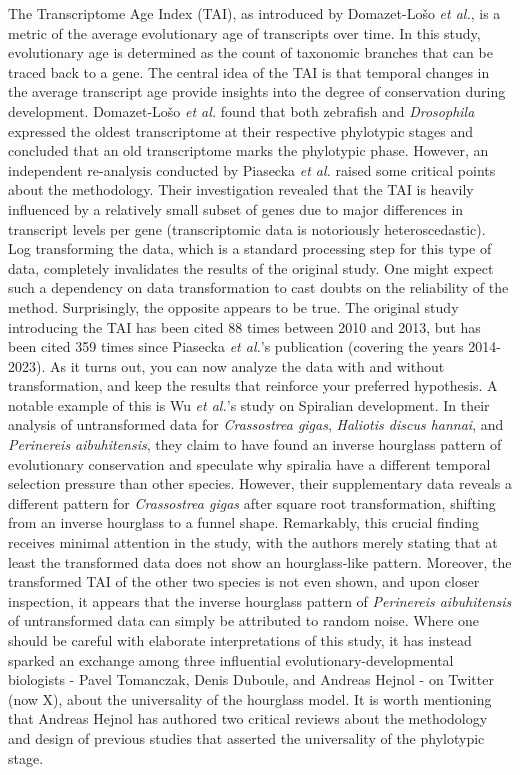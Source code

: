 The Transcriptome Age Index (TAI), as introduced by Domazet-Lošo \textit{et al.}, is a metric of the average evolutionary age of transcripts over time\cite{DomazetLoso2010}. In this study, evolutionary age is determined as the count of taxonomic branches that can be traced back to a gene. The central idea of the TAI is that temporal changes in the average transcript age provide insights into the degree of conservation during development. Domazet-Lošo \textit{et al.} found that both zebrafish and \textit{Drosophila} expressed the oldest transcriptome at their respective phylotypic stages and concluded that an old transcriptome marks the phylotypic phase. However, an independent re-analysis conducted by Piasecka \textit{et al.} raised some critical points about the methodology\cite{Piasecka2013}. Their investigation revealed that the TAI is heavily influenced by a relatively small subset of genes due to major differences in transcript levels per gene (transcriptomic data is notoriously heteroscedastic\cite{Rocke2001}). Log transforming the data, which is a standard processing step for this type of data, completely invalidates the results of the original study. One might expect such a dependency on data transformation to cast doubts on the reliability of the method. Surprisingly, the opposite appears to be true. The original study introducing the TAI has been cited 88 times between 2010 and 2013, but has been cited 359 times since Piasecka \textit{et al.}'s publication (covering the years 2014-2023). As it turns out, you can now analyze the data with and without transformation, and keep the results that reinforce your preferred hypothesis. A notable example of this is Wu \textit{et al.}'s study on Spiralian development\cite{Wu2019}. In their analysis of untransformed data for \textit{Crassostrea gigas}, \textit{Haliotis discus hannai}, and \textit{Perinereis aibuhitensis}, they claim to have found an inverse hourglass pattern of evolutionary conservation and speculate why spiralia have a different temporal selection pressure than other species. However, their supplementary data reveals a different pattern for \textit{Crassostrea gigas} after square root transformation, shifting from an inverse hourglass to a funnel shape. Remarkably, this crucial finding receives minimal attention in the study, with the authors merely stating that at least the transformed data does not show an hourglass-like pattern. Moreover, the transformed TAI of the other two species is not even shown, and upon closer inspection, it appears that the inverse hourglass pattern of \textit{Perinereis aibuhitensis} of untransformed data can simply be attributed to random noise. Where one should be careful with elaborate interpretations of this study, it has instead sparked an exchange among three influential evolutionary-developmental biologists - Pavel Tomanczak, Denis Duboule, and Andreas Hejnol - on Twitter (now X), about the universality of the hourglass model\cite{hejnoltwitter}. It is worth mentioning that Andreas Hejnol has authored two critical reviews about the methodology and design of previous studies that asserted the universality of the phylotypic stage\cite{Dunn2018,hejnol2016}.


